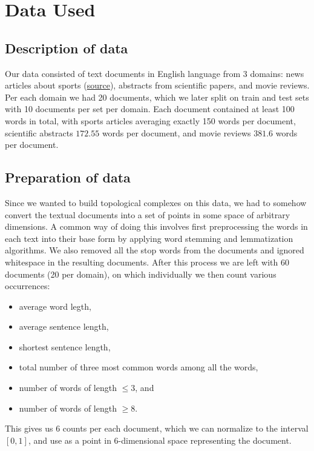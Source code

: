 \section{Data Used}
\label{sec:data_used}

\subsection{Description of data}
\label{sub:description_of_data}

Our data consisted of text documents in English language from 3 domains: news
articles about sports (\href{http://mlg.ucd.ie/datasets/bbc.html}{source}),
abstracts from scientific papers, and movie reviews. Per each domain we had 20
documents, which we later split on train and test sets with 10 documents per
set per domain. Each document contained at least 100 words in total, with
sports articles averaging exactly 150 words per document, scientific abstracts
$172.55$ words per document, and movie reviews $381.6$ words per document.

\subsection{Preparation of data}
\label{sub:preparation_of_data}

Since we wanted to build topological complexes on this data, we had to somehow
convert the textual documents into a set of points in some space of arbitrary
dimensions. A common way of doing this involves first preprocessing the words
in each text into their base form by applying word stemming and lemmatization
algorithms. We also removed all the stop words from the documents and ignored
whitespace in the resulting documents. After this process we are left with 60
documents (20 per domain), on which individually we then count various
occurrences:

\begin{itemize}
  \item average word legth,
  \item average sentence length,
  \item shortest sentence length,
  \item total number of three most common words among all the words,
  \item number of words of length $\le 3$, and
  \item number of words of length $\ge 8$.
\end{itemize}

This gives us 6 counts per each document, which we can normalize to the
interval $[0, 1]$, and use as a point in $6$-dimensional space representing
the document.

